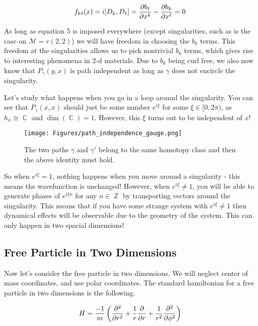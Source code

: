 \documentclass{article}
\DeclareMathOperator{\ZZ}{\mathbb{Z}}
\DeclareMathOperator{\CC}{\mathbb{C}}
\begin{document}
\begin{equation}
f_{k\ell}(x) = i[D_k,D_\ell] = \pdv{b_\ell}{x^k} - \pdv{b_k}{x^\ell}=0
\end{equation}

As long as equation 5 is imposed everywhere (except singularities, such as is the case on $\mathcal{M}=r(2,2)$) we will have freedom in choosing the $b_k$ terms. This freedom at the singularities allows us to pick nontrivial $b_k$ terms, which gives rise to interesting phenomena in 2-d materials. Due to $b_k$ being curl free, we also now know that $P_\gamma(y,x)$ is path independent as long as $\gamma$ does not encircle the singularity.

Let's study what happens when you go in a loop around the singularity. You can see that $P_\gamma(x,x)$ should just be some number $e^{i\xi}$ for some $\xi \in [0,2\pi)$, as $h_x \cong \CC$ and $\dim(\CC)=1$. However, this $\xi$ turns out to be independent of $x$!

\begin{figure}[ht]
    \centering
    \texttt{[image: Figures/path\_independence\_gauge.png]}
    \captionsetup{belowskip=-15pt}
    \caption{The two paths $ \gamma $ and $ \gamma' $ belong to the same homotopy class and then the above identity must hold.}
    \label{fig:31}
\end{figure}

So when $e^{i\xi}=1$, nothing happens when you move around a singularity - this means the wavefunction is unchanged! However, when $e^{i\xi}\neq 1$, you will be able to generate phases of $e^{i\xi n}$ for any $n \in \ZZ$ by transporting vectors around the singularity. This means that if you have some strange system with $e^{i\xi}\neq 1$ then dynamical effects will be observable due to the geometry of the system. This can only happen in two spacial dimensions!

\subsection{Free Particle in Two Dimensions}

Now let's consider the free particle in two dimensions. We will neglect center of mass coordinates, and use polar coordinates. The standard hamiltonian for a free particle in two dimensions is the following.

\begin{equation}
H = \frac{-1}{m}\left(\pdv[2]{r}+\frac{1}{r}\pdv{r}+ \frac{1}{r^2}\pdv[2]{\phi}\right)
\end{equation}
\end{document}
